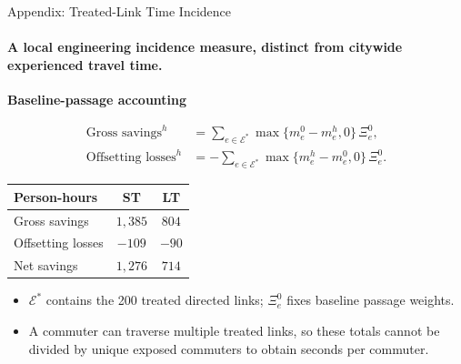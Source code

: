 \documentclass[11pt,aspectratio=169]{beamer}
\newcommand{\navback}[1]{\par\vspace{0.35em}\noindent\hfill\hyperlink{#1}{\beamerreturnbutton{back}}}
\begin{document}
\begin{frame}[label=apptreatedtime]{Appendix: Treated-Link Time Incidence}
\framesubtitle{A local engineering incidence measure, distinct from citywide experienced travel time.}
\footnotesize
\textbf{Baseline-passage accounting}\par
\vspace{0.10em}
\begin{align*}
\text{Gross savings}^{h}
  &=\sum_{e\in\mathcal E^*}\max\{m_e^0-m_e^h,0\}\,\Xi_e^0,\\
\text{Offsetting losses}^{h}
  &=-\sum_{e\in\mathcal E^*}\max\{m_e^h-m_e^0,0\}\,\Xi_e^0.
\end{align*}
\vspace{-0.45em}
\begin{center}
\renewcommand{\arraystretch}{1.18}
\begin{tabular}{lcc}
\toprule
Person-hours & ST & LT \\
\midrule
Gross savings & $1{,}385$ & $804$ \\
Offsetting losses & $-109$ & $-90$ \\
Net savings & $1{,}276$ & $714$ \\
\bottomrule
\end{tabular}
\end{center}
\vspace{0.15em}
\begin{itemize}\scriptsize\setlength\itemsep{0.25em}
  \item $\mathcal E^*$ contains the 200 treated directed links; $\Xi_e^0$ fixes baseline passage weights.
  \item A commuter can traverse multiple treated links, so these totals cannot be divided by unique exposed commuters to obtain seconds per commuter.
\end{itemize}
\navback{result2}
\end{frame}
\end{document}
